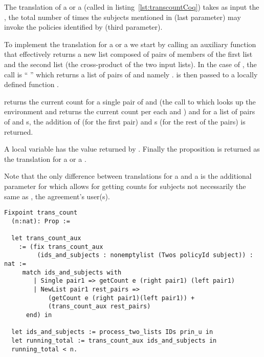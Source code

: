 The translation of a  or a  (called  in listing~\ref{lst:transcountCoq}) takes as input  the ,  the total number of times the subjects mentioned in  (last parameter) may invoke the policies identified by  (third parameter).

To implement the translation for a  or a  we start by calling an auxiliary function  that effectively returns a new list composed of pairs of members of the first list and the second list (the cross-product of the two input lists). In the case of , the call is ``  '' which returns a list of pairs of  and  namely .  is then passed to a locally defined function .

 returns the current count for a single pair of  and  (the call to  which looks up the environment  and returns the current count per each  and ) and for a list of pairs of  and s, the addition of  (for the first pair) and s (for the rest of the pairs) is returned. 

A local variable  has the value returned by . Finally the proposition  is returned as the translation for a  or a .

Note that the only difference between translations for a  and a  is the additional  parameter for  which allows for getting counts for subjects not necessarily the same as , the agreement's user(s).


\begin{minipage}[c]{0.95\textwidth}
\begin{lstlisting}
Fixpoint trans_count 
  (n:nat): Prop := 

  let trans_count_aux 
    := (fix trans_count_aux
         (ids_and_subjects : nonemptylist (Twos policyId subject)) : nat :=
     match ids_and_subjects with
        | Single pair1 => getCount e (right pair1) (left pair1)
        | NewList pair1 rest_pairs =>
            (getCount e (right pair1)(left pair1)) +
            (trans_count_aux rest_pairs)
      end) in
  
  let ids_and_subjects := process_two_lists IDs prin_u in
  let running_total := trans_count_aux ids_and_subjects in
  running_total < n.
\end{lstlisting}
\end{minipage}

